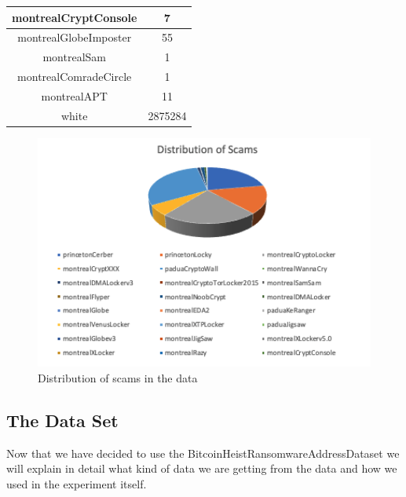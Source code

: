 \documentclass{article}
\begin{document}
\begin{center}
\begin{tabular}{||c c||}
             \hline
               montrealCryptConsole  & 7  \\ [1ex] 
             \hline
               montrealGlobeImposter & 55  \\ [1ex] 
             \hline
               montrealSam & 1  \\ [1ex] 
             \hline
               montrealComradeCircle & 1  \\ [1ex] 
             \hline
              montrealAPT & 11  \\ [1ex] 
             \hline
              white & 2875284  \\ [1ex] 
             \hline
        \end{tabular}
    \end{center}
    
       \begin{figure}
            \centering
            \includegraphics[width=150mm,scale=0.7]{Distribution of Scams.png}
            \caption{Distribution of scams in the data }
            \label{Figure 3}
        \end{figure}

\pagebreak
    \subsection{The Data Set}
        
        Now that we have decided to use the BitcoinHeistRansomwareAddressDataset we will explain in detail what kind of data we are getting from the data and how we used in the experiment itself.
        
\end{document}
